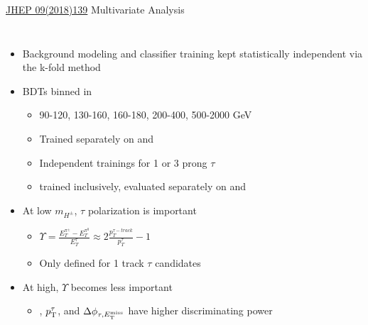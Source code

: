 \documentclass[aspectratio=169,xcolor=table]{beamer}
\begin{document}
    \begin{frame}[t]{\href{https://link.springer.com/article/10.1007/JHEP09(2018)139}{JHEP 09(2018)139} Multivariate Analysis}
    \begin{columns}[t]
    \vspace{-1cm}
      \begin{itemize}
        \item Background modeling and classifier training kept statistically independent via the k-fold method
        \item BDTs binned in \mHpm
        \begin{itemize}
          \item 90-120, 130-160, 160-180, 200-400, 500-2000 GeV
          \item Trained separately on \taujets and \taulep
          \item Independent trainings for 1 or 3 prong $\tau$
          \item \taulep trained inclusively, evaluated separately on \tauel and \taumu
        \end{itemize}
        \item At low $m_{H^{\pm}}$, $\tau$ polarization is important
        \begin{itemize}
          \item $\Upsilon = \frac{ E^{\pi^{\pm}}_{T} - E^{\pi^{0}}_{T}}{ E^{\tau}_{T} } \approx 2 \frac{p_{T}^{\tau-track}}{p_{T}^{\tau}}-1$
          \item Only defined for 1 track $\tau$ candidates
        \end{itemize}
        \item At high, \mHpm $\Upsilon$ becomes less important
        \begin{itemize}
          \item \Etm, $p_{\text{T}}^{\tau}$, and $\Delta \phi_{\tau,E_\text{T}^\text{miss}}$ have higher discriminating power
        \end{itemize}
      \end{itemize}


\end{columns}
\end{frame}
\end{document}
